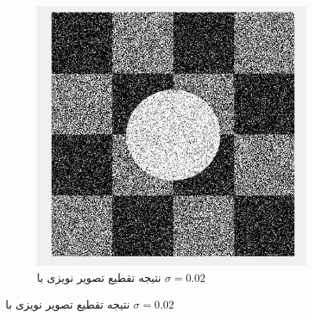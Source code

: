 \documentclass[11.5pt,a4paper]{article}
\begin{document}
\begin{figure}[h]
\begin{subfigure}{.3\textwidth}
		\includegraphics[scale=0.2]{Imgs/NB_S2_Res.png}
		\caption{نتیجه تقطیع تصویر نویزی با $\sigma=0.02$}
	\end{subfigure}


\end{figure}
\end{document}
